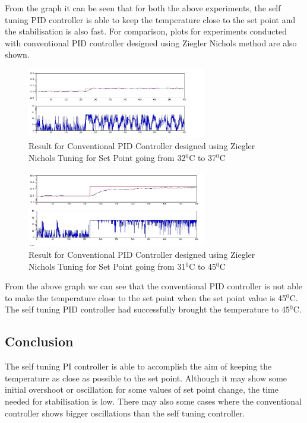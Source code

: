 From the graph it can be seen that for both the above experiments, the self tuning PID controller is able to keep the temperature close to the set point and the stabilisation is also fast. For comparison, plots for experiments conducted with conventional PID controller designed using Ziegler Nichols method are also shown.

\begin{figure}[h]
	\centering
\includegraphics[width=0.7\textwidth]{Vikas_self/report_tex/PID_results/Conventional_Tuning/Setpointchange/PID/step32to37.jpg}
	\caption{Result for Conventional PID Controller designed using Ziegler Nichols Tuning for Set Point going from 32$^0$C to 37$^0$C }
	\label{fig:step31to45}
\end{figure}


\begin{figure}[h]
	\centering
\includegraphics[width=0.7\textwidth]{Vikas_self/report_tex/PID_results/Conventional_Tuning/Setpointchange/PID/step31to45.jpg}
	\caption{Result for Conventional PID Controller designed using Ziegler Nichols Tuning for Set Point going from 31$^0$C to 45$^0$C }
	\label{fig:step31to45}
\end{figure}

From the above graph we can see that the conventional PID controller is not able to make the temperature close to the set point when the set point value is 45$^0$C. The self tuning PID controller had successfully brought the temperature to 45$^0$C.

\subsection{Conclusion}
The self tuning PI controller is able to accomplish the aim of keeping the temperature as close as possible to the set point. Although it may show some initial overshoot or oscillation for some values of set point change, the time needed for stabilisation is low. There may also some cases where the conventional controller shows bigger oscillations than the self tuning controller.\\

